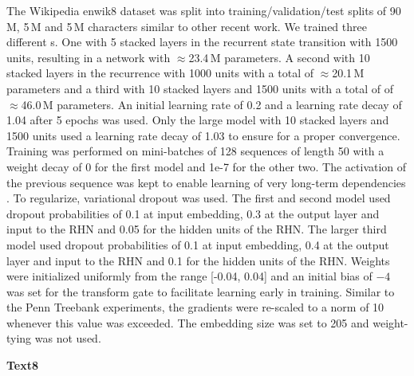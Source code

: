 \documentclass[letterpaper]{article}
\begin{document}
The Wikipedia enwik8 dataset \citep{hutter_prize} was split into training/validation/test splits of 90\,M, 5\,M and 5\,M characters similar to other recent work.
We trained three different \arch{}s. One with 5 stacked layers in the recurrent state transition with 1500 units, resulting in a network with $\approx$23.4\,M parameters. A second with 10 stacked layers in the recurrence with 1000 units with a total of $\approx$20.1\,M parameters and a third with 10 stacked layers and 1500 units with a total of of $\approx$46.0\,M parameters.
An initial learning rate of 0.2 and a learning rate decay of 1.04 after 5 epochs was used. Only the large model with 10 stacked layers and 1500 units used a learning rate decay of 1.03 to ensure for a proper convergence.
Training was performed on mini-batches of 128 sequences of length 50 with a weight decay of 0 for the first model and 1e-7 for the other two.
The activation of the previous sequence was kept to enable learning of very long-term dependencies \citep{graves_generating_sequences}. 
To regularize, variational dropout \citep{gal2015} was used. The first and second model used dropout probabilities of 0.1 at input embedding, 0.3 at the output layer and input to the RHN and 0.05 for the hidden units of the RHN. The larger third model used dropout probabilities of 0.1 at input embedding, 0.4 at the output layer and input to the RHN and 0.1 for the hidden units of the RHN.
Weights were initialized uniformly from the range [-0.04, 0.04] and an initial bias of $-4$ was set for the transform gate to facilitate learning early in training. 
Similar to the Penn Treebank experiments, the gradients were re-scaled to a norm of 10 whenever this value was exceeded. The embedding size was set to 205 and weight-tying \citep{weight_tying} was not used. 

\textbf{Text8}
\end{document}
